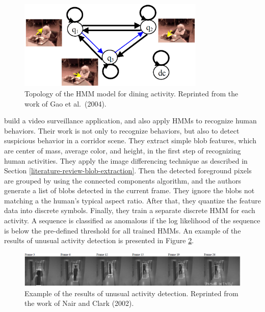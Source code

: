 \begin{figure}[t]
  \centering
  \includegraphics[width=3.5in]{figures/gao-hmm-topology.png} 
  \caption[Topology of the HMM model for dining activity]{Topology of
  the HMM model for dining activity. Reprinted from the work of Gao et
  al.\ (2004).}
 \label{fig:gao-hmm-topology}
\end{figure}

 build a video surveillance
application, and also apply HMMs to recognize human behaviors. Their
work is not only to recognize behaviors, but also to detect suspicious
behavior in a corridor scene. They extract simple blob features, which
are center of mass, average color, and height, in the first step of
recognizing human activities. They apply the image differencing
technique as described in
Section \ref{literature-review-blob-extraction}. Then the detected
foreground pixels are grouped by using the connected components
algorithm, and the authors generate a list of blobs detected in the
current frame. They ignore the blobs not matching a the human's
typical aspect ratio. After that, they quantize the feature data into
discrete symbols. Finally, they train a separate discrete HMM for each
activity. A sequence is classified as anomalous if the log likelihood
of the sequence is below the pre-defined threshold for all trained
HMMs. An example of the results of unusual activity detection is
presented in Figure \ref{fig:nair-alarm-result}.

\begin{figure}[t]
  \centering
  \includegraphics[width=6.1in]{figures/nair-alarm-result.png} 
  \caption[Example of the results of unusual activity
  detection]{Example of the results of unusual activity
  detection. Reprinted from the work of Nair and Clark (2002).}
\label{fig:nair-alarm-result}
\end{figure}

